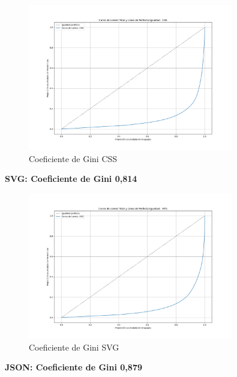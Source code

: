 \documentclass[a4paper, 12pt]{book}
\begin{document}
\begin{itemize}
\begin{itemize}
          \begin{figure}[H]
            \centering
            \includegraphics[width=0.8\textwidth]{img/curva_lorenz_total_CSS.png}
            \caption{Coeficiente de Gini CSS}
            \label{figura:ginigraficaCSS}
          \end{figure}

          \textbf{SVG: Coeficiente de Gini 0,814}

          \begin{figure}[H]
            \centering
            \includegraphics[width=0.8\textwidth]{img/curva_lorenz_total_SVG.png}
            \caption{Coeficiente de Gini SVG}
            \label{figura:ginigraficaSVG}
          \end{figure}

          \textbf{JSON: Coeficiente de Gini 0,879}


\end{itemize}
\end{itemize}
\end{document}
